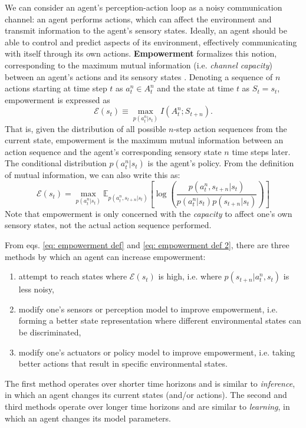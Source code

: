 We can consider an agent's perception-action loop as a noisy communication channel: an agent performs actions, which can affect the environment and transmit information to the agent's sensory states. Ideally, an agent should be able to control and predict aspects of its environment, effectively communicating with itself through its own actions. \textbf{Empowerment} formalizes this notion, corresponding to the maximum mutual information (i.e. \textit{channel capacity}) between an agent's actions and its sensory states \cite{klyubin2005empowerment}. Denoting a sequence of $n$ actions starting at time step $t$ as $a^n_t \in A^n_t$ and the state at time $t$ as $S_t = s_t$, empowerment is expressed as
\begin{equation}
    \mathcal{E} (s_t) \equiv \max_{p (a^n_t | s_t)} I(A^n_t; S_{t+n}).
    \label{eq: empowerment def}
\end{equation}
\noindent That is, given the distribution of all possible  $n$-step action sequences from the current state, empowerment is the maximum mutual information between an action sequence and the agent's corresponding sensory state $n$ time steps later. The conditional distribution $p (a^n_t | s_t)$ is the agent's policy. From the definition of mutual information, we can also write this as:
\begin{equation}
    \mathcal{E} (s_t) = \max_{p (a^n_t | s_t)} \mathbb{E}_{p(a^n_t , s_{t+n} | s_t)} \left[ \log \left( \frac{p(a^n_t , s_{t+n} | s_t)}{p (a^n_t | s_t) p (s_{t+n} | s_t)} \right) \right]
    \label{eq: empowerment def 2}
\end{equation}
Note that empowerment is only concerned with the \textit{capacity} to affect one's own sensory states, not the actual action sequence performed. 

From eqs. \ref{eq: empowerment def} and \ref{eq: empowerment def 2}, there are three methods by which an agent can increase empowerment:
\begin{enumerate}
    \item attempt to reach states where $\mathcal{E} (s_t)$ is high, i.e. where $p(s_{t+n} | a^n_t, s_t)$ is less noisy,
    \item modify one's sensors or perception model to improve empowerment, i.e. forming a better state representation where different environmental states can be discriminated,
    \item modify one's actuators or policy model to improve empowerment, i.e. taking better actions that result in specific environmental states.
\end{enumerate}
\noindent The first method operates over shorter time horizons and is similar to \textit{inference}, in which an agent changes its current states (and/or actions). The second and third methods operate over longer time horizons and are similar to \textit{learning}, in which an agent changes its model parameters.

